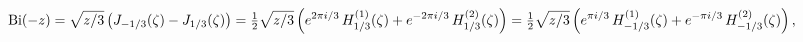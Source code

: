 \[\mathop{\mathrm{Bi}\/}\nolimits\!\left(-z\right)=\sqrt{z/3}\left(\mathop{J_{-1%
/3}\/}\nolimits\!\left(\zeta\right)-\mathop{J_{1/3}\/}\nolimits\!\left(\zeta%
\right)\right)=\tfrac{1}{2}\sqrt{z/3}\left(e^{2\pi i/3}\mathop{{H^{(1)}_{1/3}}%
\/}\nolimits\!\left(\zeta\right)+e^{-2\pi i/3}\mathop{{H^{(2)}_{1/3}}\/}%
\nolimits\!\left(\zeta\right)\right)=\tfrac{1}{2}\sqrt{z/3}\left(e^{\pi i/3}%
\mathop{{H^{(1)}_{-1/3}}\/}\nolimits\!\left(\zeta\right)+e^{-\pi i/3}\mathop{{%
H^{(2)}_{-1/3}}\/}\nolimits\!\left(\zeta\right)\right),\]